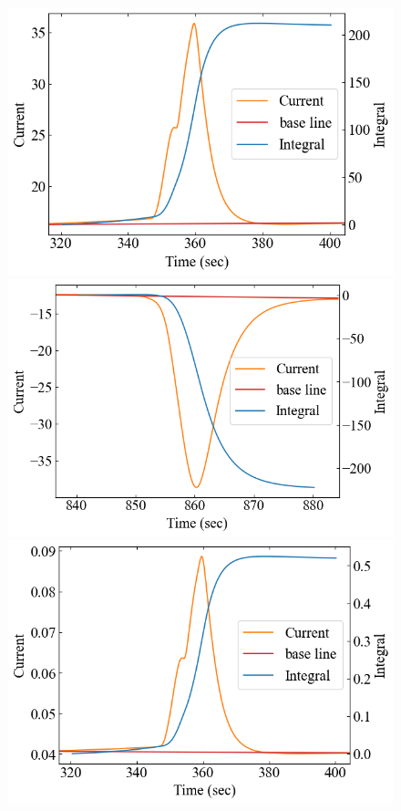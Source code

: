 \documentclass[9pt,dvipdfmx,a4paper]{jsarticle}
\begin{document}
\begin{figure}[hbt]
    \begin{minipage}[t]{0.245\columnwidth}
        \centering
        \includegraphics[width = \columnwidth]{appendix/BTO-dHdt-heat.png}
    \end{minipage}
    \hfill
    \begin{minipage}[t]{0.245\columnwidth}
        \centering
        \includegraphics[width = \columnwidth]{appendix/BTO-dHdt-cool.png}
    \end{minipage}
    \hfill
    \begin{minipage}[t]{0.245\columnwidth}
        \centering
        \includegraphics[width = \columnwidth]{appendix/BTO-dSdt-heat.png}

\end{minipage}
\end{figure}
\end{document}
